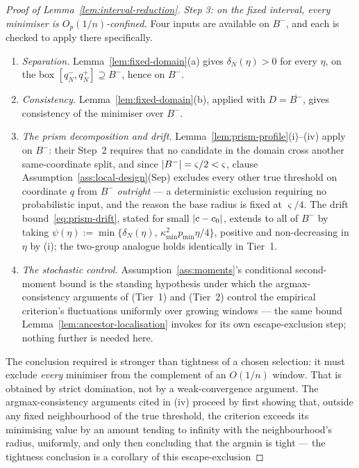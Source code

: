 \documentclass[11pt]{article}
\theoremstyle{plain}
\theoremstyle{definition}
\theoremstyle{remark}
\DeclarePairedDelimiter{\abs}{\lvert}{\rvert}
\begin{document}
\begin{proof}[Proof of Lemma~\ref{lem:interval-reduction}]
\emph{Step 3: on the fixed interval, every minimiser is $O_p(1/n)$-confined.}
Four inputs are available on $B^-$, and each is checked to apply there
specifically.
\begin{enumerate}[label=(\roman*),nosep]
  \item \emph{Separation.} Lemma~\ref{lem:fixed-domain}(a) gives
  $\delta_N(\eta)>0$ for every $\eta$, on the box $[q_N^-,q_N^+]\supseteq
  B^-$, hence on $B^-$.
  \item \emph{Consistency.} Lemma~\ref{lem:fixed-domain}(b), applied with
  $D=\overline{B^-}$, gives consistency of the minimiser over $B^-$.
  \item \emph{The prism decomposition and drift.}
  Lemma~\ref{lem:prism-profile}(i)--(iv) apply on $B^-$: their Step~2 requires
  that no candidate in the domain cross another same-coordinate split, and
  since $\abs{B^-}=\varsigma/2<\varsigma$, clause
  Assumption~\ref{ass:local-design}(Sep) excludes every other true threshold
  on coordinate $q$ from $B^-$ \emph{outright} --- a deterministic exclusion
  requiring no probabilistic input, and the reason the base radius is fixed at
  $\varsigma/4$. The drift bound~\eqref{eq:prism-drift}, stated for small
  $\abs{c-c_0}$, extends to all of $B^-$ by taking
  $\psi(\eta):=\min\{\delta_N(\eta),\,\kappa_{\min}^2p_{\min}\eta/4\}$, positive
  and non-decreasing in $\eta$ by (i); the two-group analogue holds identically
  in Tier~1.
  \item \emph{The stochastic control.} Assumption~\ref{ass:moments}'s
  conditional second-moment bound is the standing hypothesis under which the
  argmax-consistency arguments of \citet{chan1993,seijosen2011} (Tier~1) and
  \citet{seootsu2018} (Tier~2) control the empirical criterion's fluctuations
  uniformly over growing windows --- the same bound
  Lemma~\ref{lem:ancestor-localisation} invokes for its own escape-exclusion
  step; nothing further is needed here.
\end{enumerate}
The conclusion required is stronger than tightness of a chosen selection: it
must exclude \emph{every} minimiser from the complement of an $O(1/n)$ window.
That is obtained by strict domination, not by a weak-convergence argument. The
argmax-consistency arguments cited in (iv) proceed by first showing that,
outside any fixed neighbourhood of the true threshold, the criterion exceeds
its minimising value by an amount tending to infinity with the
neighbourhood's radius, uniformly, and only then concluding that the argmin
is tight --- the tightness conclusion is a corollary of this escape-exclusion

\end{proof}
\end{document}
